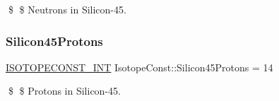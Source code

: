 \$ \$ Neutrons in Silicon-\/45. \mbox{\label{group___isotope_const-_silicon-_si45_ga92387918ab4d551306ca2523cc04a981}} 
\subsubsection{\texorpdfstring{Silicon45\+Protons}{Silicon45Protons}}
{\footnotesize\ttfamily \mbox{\hyperlink{group___isotope_const-_macros_ga5f18360b3e99483a35c32d789e62621c}{I\+S\+O\+T\+O\+P\+E\+C\+O\+N\+S\+T\+\_\+\+I\+NT}} Isotope\+Const\+::\+Silicon45\+Protons = 14}

\$ \$ Protons in Silicon-\/45. 